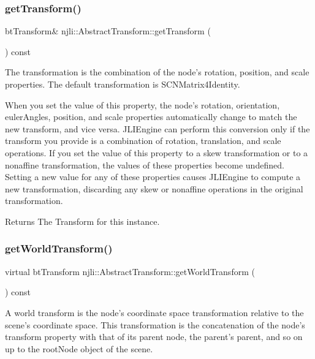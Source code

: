\subsubsection{\texorpdfstring{get\+Transform()}{getTransform()}}
{\footnotesize\ttfamily bt\+Transform\& njli\+::\+Abstract\+Transform\+::get\+Transform (\begin{DoxyParamCaption}{ }\end{DoxyParamCaption}) const}

The transformation is the combination of the node’s rotation, position, and scale properties. The default transformation is S\+C\+N\+Matrix4\+Identity.

When you set the value of this property, the node’s rotation, orientation, euler\+Angles, position, and scale properties automatically change to match the new transform, and vice versa. J\+L\+I\+Engine can perform this conversion only if the transform you provide is a combination of rotation, translation, and scale operations. If you set the value of this property to a skew transformation or to a nonaffine transformation, the values of these properties become undefined. Setting a new value for any of these properties causes J\+L\+I\+Engine to compute a new transformation, discarding any skew or nonaffine operations in the original transformation.

\begin{DoxyReturn}{Returns}
The Transform for this instance. 
\end{DoxyReturn}
\mbox{\label{classnjli_1_1_abstract_transform_a25e1a5d3daf3c0c5839915f33e37e51a}} 
\subsubsection{\texorpdfstring{get\+World\+Transform()}{getWorldTransform()}}
{\footnotesize\ttfamily virtual bt\+Transform njli\+::\+Abstract\+Transform\+::get\+World\+Transform (\begin{DoxyParamCaption}{ }\end{DoxyParamCaption}) const\hspace{0.3cm}{\ttfamily [pure virtual]}}

A world transform is the node’s coordinate space transformation relative to the scene’s coordinate space. This transformation is the concatenation of the node’s transform property with that of its parent node, the parent’s parent, and so on up to the root\+Node object of the scene.

